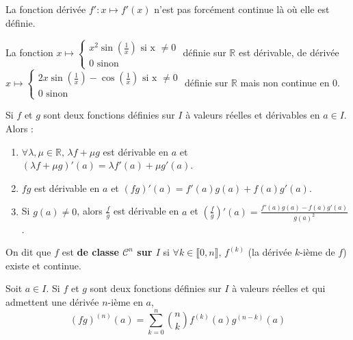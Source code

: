 
  \begin{remark}
    La fonction dérivée $f' : x \mapsto f'(x)$ n'est pas forcément continue là où elle est définie.
  \end{remark}

  \begin{example}
    La fonction $x \mapsto \begin{cases}
      x^2 \sin \left(\frac{1}{x}\right) \text{ si x } \neq 0 \\
      0 \text{ sinon}
    \end{cases}$ définie sur $\mathbb{R}$ est dérivable, de dérivée $x \mapsto \begin{cases}
    2x \sin \left(\frac{1}{x}\right) - \cos \left(\frac{1}{x}\right) \text{ si x } \neq 0 \\
    0 \text{ sinon}
    \end{cases}$ définie sur $\mathbb{R}$ mais non continue en $0$.
  \end{example}

  \begin{proposition}
    Si $f$ et $g$ sont deux fonctions définies sur $I$ à valeurs réelles et dérivables en $a \in I$. Alors :
    \begin{enumerate}[label={\bfseries(\roman*)}]
      \item $\forall \lambda, \mu \in \mathbb{R}, \, \lambda f + \mu g$ est dérivable en $a$ et $(\lambda f + \mu g)'(a) = \lambda f'(a) + \mu g'(a)$.
      \item $fg$ est dérivable en $a$ et $(fg)'(a) = f'(a) g(a) + f(a) g'(a)$.
      \item Si $g(a) \neq 0$, alors $\frac{f}{g}$ est dérivable en $a$ et $\left(\frac{f}{g}\right)'(a) = \frac{f'(a) g(a) - f(a) g'(a)}{g(a)^2}$.
     \end{enumerate}
  \end{proposition}

  \begin{definition}
    On dit que $f$ est \textbf{de classe $\mathcal{C}^n$ sur $I$} si $\forall k \in \llbracket 0, n \rrbracket$, $f^{(k)}$ (la dérivée $k$-ième de $f$) existe et continue.
  \end{definition}

  \begin{proposition}
    Soit $a \in I$. Si $f$ et $g$ sont deux fonctions définies sur $I$ à valeurs réelles et qui admettent une dérivée $n$-ième en $a$,
    \[ (fg)^{(n)}(a) = \sum_{k=0}^n \binom{n}{k} f^{(k)}(a) g^{(n-k)}(a) \]
  \end{proposition}

